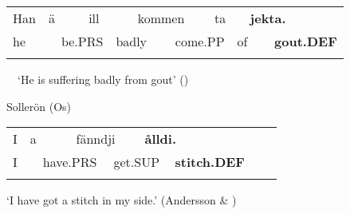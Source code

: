 \begin{tabular}{llllllllllll}
\lsptoprule
Han & \multicolumn{2}{l}{ä

} & \multicolumn{2}{l}{ill

} & \multicolumn{2}{l}{kommen

} & \multicolumn{2}{l}{ta

} & \multicolumn{2}{l}{{\bfseries jekta.}

} & \\
\multicolumn{2}{l}{he

} & \multicolumn{2}{l}{be.PRS

} & \multicolumn{2}{l}{badly

} & \multicolumn{2}{l}{come.PP

} & \multicolumn{2}{l}{of

} & \multicolumn{2}{l}{{\bfseries gout.DEF}

}\\
\lspbottomrule
\end{tabular}

\ \ ‘He is suffering badly from gout’ (\citet{Broberg1936})

\begin{listWWNumileveli}
\item 

\begin{styleExample}
Sollerön (Os) 

\end{styleExample}

\end{listWWNumileveli}

\begin{tabular}{llllllllll}
\lsptoprule
I & \multicolumn{2}{l}{a

} & \multicolumn{2}{l}{fänndji

} & \multicolumn{2}{l}{{\bfseries ålldi.}

} & \multicolumn{2}{l}{} & \\
\multicolumn{2}{l}{I

} & \multicolumn{2}{l}{have.PRS

} & \multicolumn{2}{l}{get.SUP

} & \multicolumn{2}{l}{{\bfseries stitch.DEF}

} & \multicolumn{2}{l}{}\\
\lspbottomrule
\end{tabular}

\begin{styleTranslation}
‘I have got a stitch in my side.’ (Andersson \& \citet[285]{Danielsson1999})

\end{styleTranslation}


